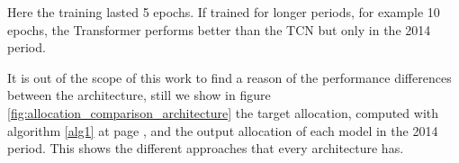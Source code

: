 Here the training lasted 5 epochs. If trained for longer periods, for example 10 epochs, the Transformer performs better than the TCN but only in the 2014 period.


It is out of the scope of this work to find a reason of the performance differences between the architecture, still we show in figure \ref{fig:allocation_comparison_architecture} the target allocation, computed with algorithm \ref{alg1} at page \pageref{alg1}, and the output allocation of each model in the 2014 period. This shows the different approaches that every architecture has.

\begin{figure}[h]
	\centering
	\qquad

\end{figure}
